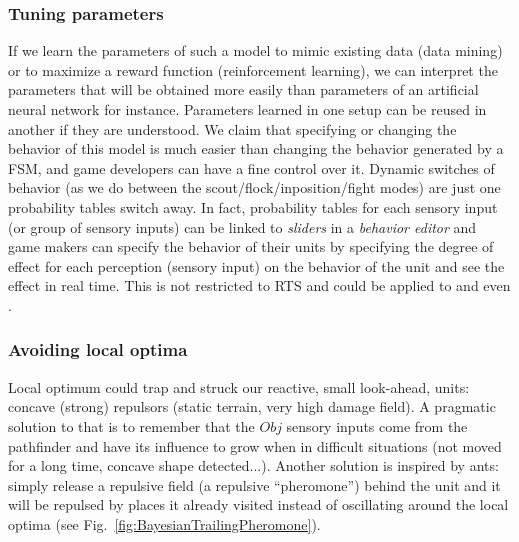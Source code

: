 \subsubsection{Tuning parameters}
If we learn the parameters of such a model to mimic existing data (data mining) or to maximize a reward function (reinforcement learning), we can interpret the parameters that will be obtained more easily than parameters of an artificial neural network for instance. Parameters learned in one setup can be reused in another if they are understood. We claim that specifying or changing the behavior of this model is much easier than changing the behavior generated by a FSM, and game developers can have a fine control over it. Dynamic switches of behavior (as we do between the scout/flock/inposition/fight modes) are just one probability tables switch away. In fact, probability tables for each sensory input (or group of sensory inputs) can be linked to \textit{sliders} in a \textit{behavior editor} and game makers can specify the behavior of their units by specifying the degree of effect for each perception (sensory input) on the behavior of the unit and see the effect in real time. This is not restricted to RTS and could be applied to  and even  .

\subsubsection{Avoiding local optima}
\label{sec:microavoidlocal}
Local optimum could trap and struck our reactive, small look-ahead, units: concave (strong) repulsors (static terrain, very high damage field). A pragmatic solution to that is to remember that the $Obj$ sensory inputs come from the pathfinder and have its influence to grow when in difficult situations (not moved for a long time, concave shape detected...). Another solution is inspired by ants: simply release a repulsive field (a repulsive ``pheromone'') behind the unit and it will be repulsed by places it already visited instead of oscillating around the local optima (see Fig.~\ref{fig:BayesianTrailingPheromone}).

